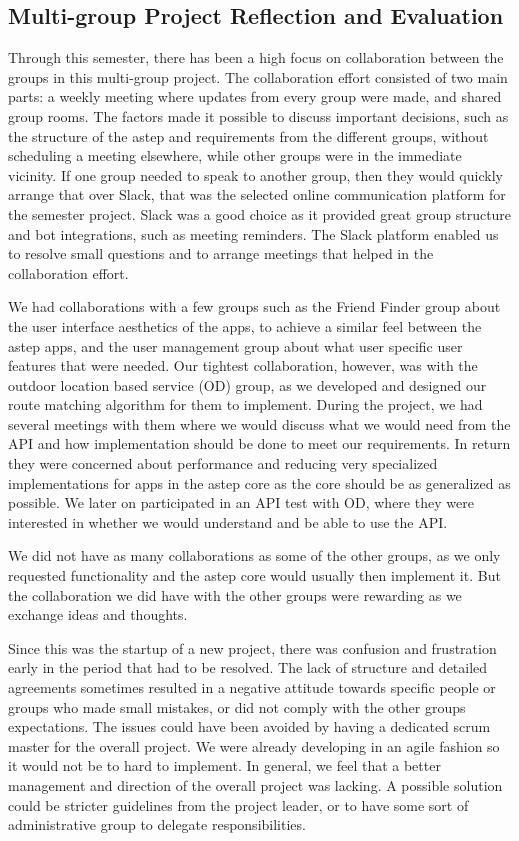 \subsection{Multi-group Project Reflection and Evaluation}
Through this semester, there has been a high focus on collaboration between the groups in this multi-group project.
The collaboration effort consisted of two main parts: a weekly meeting where updates from every group were made, and shared group rooms.
The factors made it possible to discuss important decisions, such as the structure of the \gls{astep} and requirements from the different groups, without scheduling a meeting elsewhere, while other groups were in the immediate vicinity.
If one group needed to speak to another group, then they would quickly arrange that over Slack, that was the selected online communication platform for the semester project.
Slack was a good choice as it provided great group structure and bot integrations, such as meeting reminders. 
The Slack platform enabled us to resolve small questions and to arrange meetings that helped in the collaboration effort.

We had collaborations with a few groups such as the Friend Finder group about the user interface aesthetics of the apps, to achieve a similar feel between the \gls{astep} apps, and the user management group about what user specific user features that were needed.
Our tightest collaboration, however, was with the outdoor location based service (OD) group, as we developed and designed our route matching algorithm for them to implement.
During the project, we had several meetings with them where we would discuss what we would need from the API and how implementation should be done to meet our requirements.
In return they were concerned about performance and reducing very specialized implementations for apps in the \gls{astep} core as the core should be as generalized as possible.
We later on participated in an API test with OD, where they were interested in whether we would understand and be able to use the API.

We did not have as many collaborations as some of the other groups, as we only requested functionality and the \gls{astep} core would usually then implement it.
But the collaboration we did have with the other groups were rewarding as we exchange ideas and thoughts.

Since this was the startup of a new project, there was confusion and frustration early in the period that had to be resolved.
The lack of structure and detailed agreements sometimes resulted in a negative attitude towards specific people or groups who made small mistakes, or did not comply with the other groups expectations.
The issues could have been avoided by having a dedicated scrum master for the overall project.
We were already developing in an agile fashion so it would not be to hard to implement.
In general, we feel that a better management and direction of the overall project was lacking.
A possible solution could be stricter guidelines from the project leader, or to have some sort of administrative group to delegate responsibilities.
